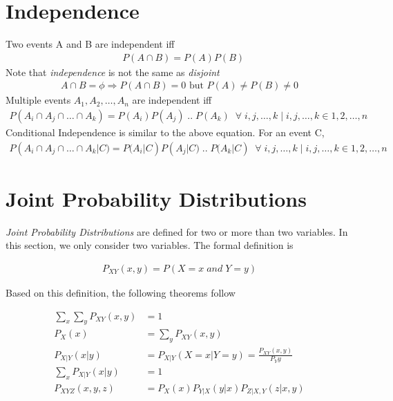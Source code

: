 \documentclass[../probability-notes.tex]{subfiles}
\begin{document}
    \section{Independence}
    Two events A and B are independent iff
    \begin{align*}
        &P(A \cap B) = P(A) P(B)
    \end{align*}
    Note that \emph{independence} is not the same as \emph{disjoint}
    \begin{align*}
    A \cap B = \phi \Rightarrow P(A \cap B) = 0 \text{ but } P(A) \neq P(B) \neq 0
    \end{align*}
    Multiple events $A_{1}, A_{2}, \ldots , A_{n}$ are independent iff
    \begin{align*}
        P(A_{i} \cap A_{j} \cap \ldots \cap A_{k}) = P(A_{i}) P(A_{j}) \;..\; P(A_{k}) \;\;\forall\;i,j,\ldots,k \;|\; i,j,\ldots,k \in {1,2,\ldots,n}
    \end{align*}
    Conditional Independence is similar to the above equation. For an event C,
    \begin{align*}
        P(A_{i} \cap A_{j} \cap \ldots \cap A_{k} | C) = P(A_{i}|C) P(A_{j}|C) \;..\; P(A_{k}|C) \;\;\forall\;i,j,\ldots,k \;|\; i,j,\ldots,k \in {1,2,\ldots,n}
    \end{align*}
    
    \section{Joint Probability Distributions}
    \emph{Joint Probability Distributions} are defined for two or more than two variables. In this section, we only consider two variables. The formal definition is

    \begin{align*}
        P_{XY}(x, y) = P(X = x \;and\; Y = y)
    \end{align*}

    Based on this definition, the following theorems follow

    \begin{align*}
        \sum_{x} \sum_{y} P_{XY}(x,y) &= 1 \\
        P_{X}(x) &= \sum_{y} P_{XY}(x,y) \tag*{Marginal Probability} \\
        P_{X|Y}(x|y) &= P_{X|Y}(X=x|Y=y) = \frac{P_{XY}(x,y)}{P_{Y}{y}} \\
        \sum_{x} P_{X|Y}(x|y) &= 1 \tag*{Since Y is fixed and we sum over all X's} \\
        P_{XYZ}(x,y,z) &= P_{X}(x) P_{Y|X}(y|x) P_{Z|X,Y}(z|x,y) \tag*{Chain Rule}
    \end{align*}
\end{document}
